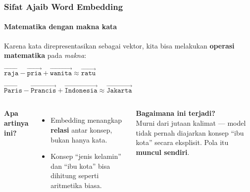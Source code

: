\documentclass[t,aspectratio=169,xcolor=dvipsnames]{beamer}
\begin{document}
\begin{frame}
    \frametitle{Sifat Ajaib Word Embedding}
    \framesubtitle{Matematika dengan makna kata}
    \small
    Karena kata direpresentasikan sebagai vektor, kita bisa melakukan \textbf{operasi matematika} pada \textit{makna}:

    \vspace{0.15em}
    \begin{center}
    \begin{tcolorbox}[colback=nyublue!10, colframe=nyublue, boxrule=0.8mm, width=0.78\textwidth, halign=center]
        \large
        $\vec{\texttt{raja}} - \vec{\texttt{pria}} + \vec{\texttt{wanita}} \approx \vec{\texttt{ratu}}$
    \end{tcolorbox}
    \end{center}
    \vspace{0.1em}
    \begin{center}
    \begin{tcolorbox}[colback=nyublue!10, colframe=nyublue, boxrule=0.8mm, width=0.78\textwidth, halign=center]
        \large
        $\vec{\texttt{Paris}} - \vec{\texttt{Prancis}} + \vec{\texttt{Indonesia}} \approx \vec{\texttt{Jakarta}}$
    \end{tcolorbox}
    \end{center}
    \vspace{0.15em}
    \begin{columns}[T]
        \textbf{Apa artinya ini?}
        \begin{itemize}
            \item Embedding menangkap \textbf{relasi} antar konsep, bukan hanya kata.
            \item Konsep ``jenis kelamin'' dan ``ibu kota'' bisa dihitung seperti aritmetika biasa.
        \end{itemize}
        \textbf{Bagaimana ini terjadi?}\\[0.2em]
        Murni dari jutaan kalimat --- model tidak pernah diajarkan konsep ``ibu kota'' secara eksplisit. Pola itu \textbf{muncul sendiri}.
    \end{columns}
\end{frame}
\end{document}
